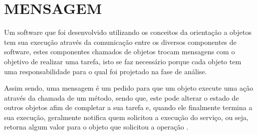 \section{MENSAGEM}

Um software que foi desenvolvido utilizando os conceitos da orientação a 
objetos tem sua execução através da comunicação entre os diversos componentes 
de software, estes componentes chamados de objetos trocam mensagens com o 
objetivo de realizar uma tarefa, isto se faz necessário porque cada objeto  tem
uma responsabilidade para o qual foi projetado na fase de análise.

Assim sendo, uma mensagem é um pedido para que um objeto execute uma ação 
através da chamada de um método, sendo que, este pode alterar o estado de 
outros objetos afim de completar a sua tarefa e, quando ele finalmente termina
a sua execução, geralmente notifica quem solicitou a execução do serviço, ou
seja, retorna algum valor para o objeto que solicitou a operação 
\cite{c++ComoProgramar}.